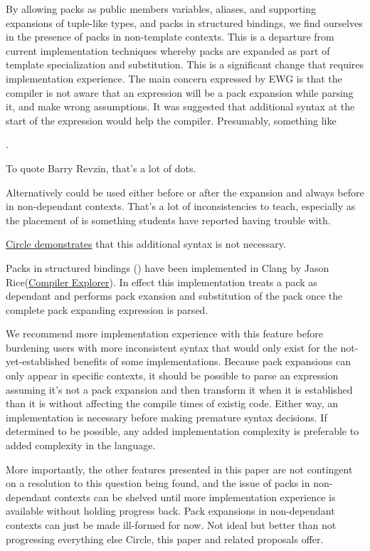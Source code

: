 \documentclass{wg21}
\begin{document}
By allowing packs as public members variables, aliases, and supporting expansions of tuple-like types,
and packs in structured bindings, we find ourselves in the presence of packs in non-template contexts.
This is a departure from current implementation techniques whereby packs are expanded as part of template specialization and substitution.
This is a significant change that requires implementation experience.
The main concern expressed by EWG is that the compiler is not aware that an expression will be a pack expansion while parsing it,
and make wrong assumptions.
It was suggested that additional syntax at the start of the expression would help the compiler. Presumably, something like

.

To quote Barry Revzin, that's a lot of dots.

Alternatively  could be used either before or after the expansion and always before in non-dependant contexts. That's a lot of inconsistencies to teach, especially as the placement of  is something students have reported having trouble with.

\href{https://godbolt.org/z/9ef4r69Wh}{Circle demonstrates} that this additional syntax is not necessary.

Packs in structured bindings () have been implemented in Clang by Jason Rice(\href{https://godbolt.org/z/Tnz4e1dY9}{Compiler Explorer}). In effect this implementation treats a pack as dependant and performs
pack exansion and substitution of the pack once the complete pack expanding expression is parsed.

We recommend more implementation experience with this feature before burdening users with more inconsistent syntax
that would only exist for the not-yet-established benefits of some implementations.
Because pack expansions can only appear in specific contexts, it should be possible to parse an expression
assuming it's not a pack expansion and then transform it when it is established than it is without affecting the compile times of existig code.
Either way, an implementation is necessary before making premature syntax decisions.
If determined to be possible, any added implementation complexity is preferable to added complexity in the language.

More importantly, the other features presented in this paper are not contingent on a resolution to this question being found, and the issue of packs in non-dependant contexts can be shelved until more implementation experience is available without holding progress back.
Pack expansions in non-dependant contexts can just be made ill-formed for now. Not ideal but better than not progressing everything else Circle, this paper and related proposals offer.
\end{document}
